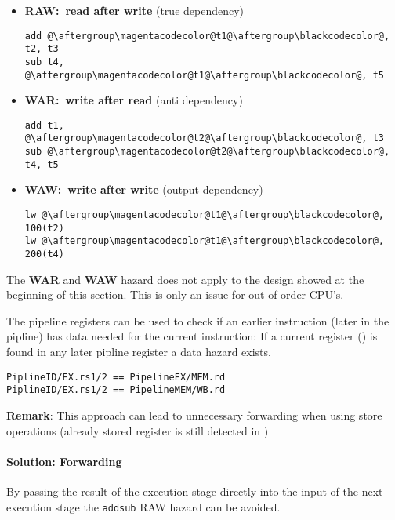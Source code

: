 \begin{multicols*}{2}
    \begin{itemize}
        \item \textbf{RAW:\ read after write} (true dependency)
              \begin{lstlisting}[escapechar=@]
add @\aftergroup\magentacodecolor@t1@\aftergroup\blackcodecolor@, t2, t3
sub t4, @\aftergroup\magentacodecolor@t1@\aftergroup\blackcodecolor@, t5
\end{lstlisting}
        \item \textbf{WAR:\ write after read} (anti dependency)
              \begin{lstlisting}[escapechar=@]
add t1, @\aftergroup\magentacodecolor@t2@\aftergroup\blackcodecolor@, t3
sub @\aftergroup\magentacodecolor@t2@\aftergroup\blackcodecolor@, t4, t5
\end{lstlisting}
        \item \textbf{WAW:\ write after write} (output dependency)
              \begin{lstlisting}[escapechar=@]
lw @\aftergroup\magentacodecolor@t1@\aftergroup\blackcodecolor@, 100(t2)
lw @\aftergroup\magentacodecolor@t1@\aftergroup\blackcodecolor@, 200(t4)
\end{lstlisting}
    \end{itemize}

    The \textbf{WAR} and \textbf{WAW} hazard does not apply to the design showed at the beginning of this section. This is only an issue for out-of-order CPU's.

    \newpar{}

    The pipeline registers can be used to check if an earlier instruction (later in the pipline) has data needed for the current instruction:
    If a current  register () is found in any later pipline register a data hazard exists.
    \begin{lstlisting}
PiplineID/EX.rs1/2 == PipelineEX/MEM.rd
PiplineID/EX.rs1/2 == PipelineMEM/WB.rd
    \end{lstlisting}
    \textbf{Remark}: This approach can lead to unnecessary forwarding when using store operations (already stored register is still detected in )

    \paragraph{Solution: Forwarding}
    By passing the result of the execution stage directly into the input of the next execution stage the \texttt{add}\textleftarrow\texttt{sub} RAW hazard can be avoided.


\end{multicols*}
